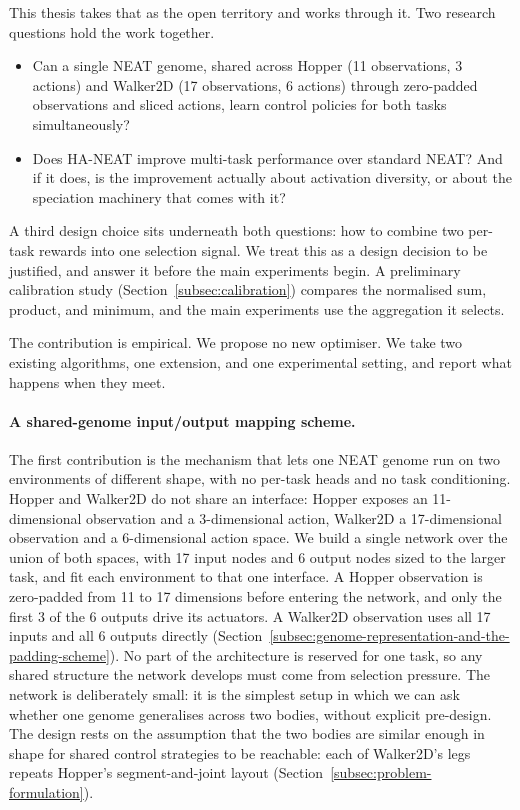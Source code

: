 \documentclass[12pt]{article}
\begin{document}
This thesis takes that as the open territory and works through it.
Two research questions hold the work together.
\begin{itemize}
    \item Can a single NEAT genome, shared across Hopper (11 observations, 3 actions) and Walker2D (17 observations, 6 actions) through zero-padded observations and sliced actions, learn control policies for both tasks simultaneously?
    \item Does HA-NEAT improve multi-task performance over standard NEAT? And if it does, is the improvement actually about activation diversity, or about the speciation machinery that comes with it?
\end{itemize}
A third design choice sits underneath both questions: how to combine two per-task rewards into one selection signal.
We treat this as a design decision to be justified, and answer it before the main experiments begin.
A preliminary calibration study (Section~\ref{subsec:calibration}) compares the normalised sum, product, and minimum, and the main experiments use the aggregation it selects.

The contribution is empirical.
We propose no new optimiser. We take two existing algorithms, one extension, and one experimental setting, and report what happens when they meet.

\paragraph{A shared-genome input/output mapping scheme.}
The first contribution is the mechanism that lets one NEAT genome run on two environments of different shape, with no per-task heads and no task conditioning.
Hopper and Walker2D do not share an interface: Hopper exposes an 11-dimensional observation and a 3-dimensional action, Walker2D a 17-dimensional observation and a 6-dimensional action space.
We build a single network over the union of both spaces, with 17 input nodes and 6 output nodes sized to the larger task, and fit each environment to that one interface.
A Hopper observation is zero-padded from 11 to 17 dimensions before entering the network, and only the first 3 of the 6 outputs drive its actuators. A Walker2D observation uses all 17 inputs and all 6 outputs directly (Section~\ref{subsec:genome-representation-and-the-padding-scheme}).
No part of the architecture is reserved for one task, so any shared structure the network develops must come from selection pressure.
The network is deliberately small: it is the simplest setup in which we can ask whether one genome generalises across two bodies, without explicit pre-design.
The design rests on the assumption that the two bodies are similar enough in shape for shared control strategies to be reachable: each of Walker2D's legs repeats Hopper's segment-and-joint layout (Section~\ref{subsec:problem-formulation}).
\end{document}
